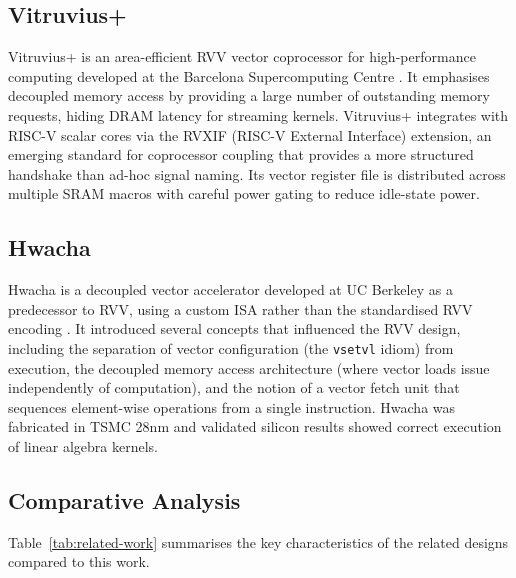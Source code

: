 \subsection{Vitruvius+}

Vitruvius+ is an area-efficient RVV vector coprocessor for high-performance computing
developed at the Barcelona Supercomputing Centre \cite{vitruvius2021}. It emphasises
decoupled memory access by providing a large number of outstanding memory requests,
hiding DRAM latency for streaming kernels. Vitruvius+ integrates with RISC-V scalar
cores via the RVXIF (RISC-V External Interface) extension, an emerging standard for
coprocessor coupling that provides a more structured handshake than ad-hoc signal
naming. Its vector register file is distributed across multiple SRAM macros with
careful power gating to reduce idle-state power.

\subsection{Hwacha}

Hwacha is a decoupled vector accelerator developed at UC Berkeley as a predecessor to
RVV, using a custom ISA rather than the standardised RVV encoding \cite{hwacha2015}.
It introduced several concepts that influenced the RVV design, including the separation
of vector configuration (the \texttt{vsetvl} idiom) from execution, the decoupled
memory access architecture (where vector loads issue independently of computation),
and the notion of a vector fetch unit that sequences element-wise operations from a
single instruction. Hwacha was fabricated in TSMC 28nm and validated silicon results
showed correct execution of linear algebra kernels.

\subsection{Comparative Analysis}

Table~\ref{tab:related-work} summarises the key characteristics of the related designs
compared to this work.


